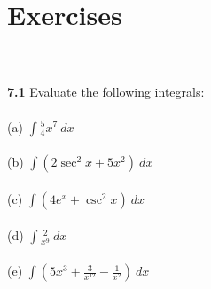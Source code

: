 \documentclass[11pt]{scrartcl}
\begin{document}
\section{Exercises} \\
\\
\noindent 
\textbf{7.1} Evaluate the following integrals: \\
\\
\noindent 
(a) $\int{\frac{5}{4}x^7} \ dx$\\
\\
\noindent 
(b) $\int{(2\sec^2 x +5x^2) \ dx}$\\
\\
\noindent 
(c) $\int{(4e^x + \csc ^2 x) \ dx}$\\
\\
\noindent 
(d) $\int \frac{2}{x^9} \ dx$\\
\\
\noindent 
(e) $\int{(5x^3+\frac{3}{x^{12}}-\frac{1}{x^2}) \ dx}$
\end{document}

